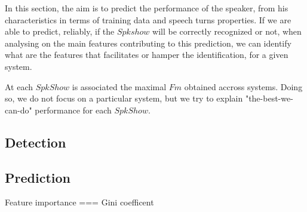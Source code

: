 In this section, the aim is to predict the performance of the speaker, from his characteristics in terms of training data and speech turns properties. If we are able to predict, reliably, if the $Spkshow$ will be correctly recognized or not, when analysing on the main features contributing to this prediction, we can identify what are the features that  facilitates or hamper the identification, for a given system.

At each $SpkShow$ is associated the maximal $Fm$ obtained accross systems. Doing so, we do not focus on a particular system, but we try to explain "the-best-we-can-do" performance for each $SpkShow$.

\subsection{Detection}


\subsection{Prediction}


Feature importance === Gini coefficent~\cite{Breiman2001}
